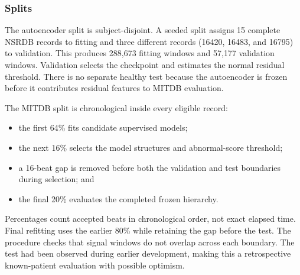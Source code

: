 \subsubsection{Splits}

The autoencoder split is subject-disjoint. A seeded split assigns 15 complete
NSRDB records to fitting and three different records (16420, 16483, and 16795)
to validation. This produces 288,673 fitting windows and 57,177 validation
windows. Validation selects the checkpoint and estimates the normal residual
threshold. There is no separate healthy test because the autoencoder is frozen
before it contributes residual features to MITDB evaluation.

The MITDB split is chronological inside every eligible record:
\begin{itemize}
    \item the first 64\% fits candidate supervised models;
    \item the next 16\% selects the model structures and abnormal-score
    threshold;
    \item a 16-beat gap is removed before both the validation and test
    boundaries during selection; and
    \item the final 20\% evaluates the completed frozen hierarchy.
\end{itemize}
Percentages count accepted beats in chronological order, not exact elapsed
time. Final refitting uses the earlier 80\% while retaining the gap before the test.
The procedure checks that signal windows do not overlap across each boundary. The test had been observed
during earlier development, making this a retrospective known-patient
evaluation with possible optimism.

